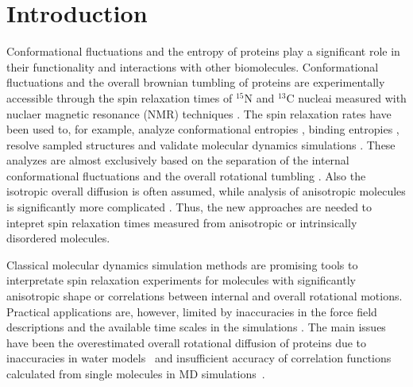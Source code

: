 \documentclass[pre,aps,floatfix,authordate1-4,twocolumn]{revtex4-1}
\begin{document}

\maketitle %



\section{Introduction}
Conformational fluctuations and the entropy of proteins
play a significant role in their functionality
and interactions with other biomolecules.
Conformational fluctuations and the overall brownian tumbling of proteins
are experimentally accessible through the 
spin relaxation times of $^{15}$N and $^{13}$C nucleai measured
with nuclaer magnetic resonance (NMR) 
techniques \cite{jarymowycz06,korzhnev01,mulder01,eisenmesser05,bedem15,lewandowski15,lamley15}. 
The spin relaxation rates have been used to, for example, analyze
conformational entropies \cite{yang96,kasinath13,allner15,jarymowycz06}, binding entropies \cite{akke93,jarymowycz06},
resolve sampled structures \cite{mulder01,eisenmesser05,bedem15,medina14}
and validate molecular dynamics simulations \cite{best04,showalter07a,showalter07b,maragakis08,trbovic08}.
These analyzes are almost exclusively based on the
separation of the internal conformational fluctuations 
and the overall rotational tumbling \cite{wennerstrom79,Lipari82}.
Also the isotropic overall diffusion is often assumed, while
analysis of anisotropic molecules is significantly more
complicated \cite{woessner62,shimizu62,jarymowycz06,korzhnev01,luginbuhl97,hall04}.
Thus, the new approaches are needed to intepret spin relaxation times
measured from anisotropic or intrinsically disordered molecules.

Classical molecular dynamics simulation methods are
promising tools to interpretate spin relaxation experiments
for molecules with significantly anisotropic shape or correlations between
internal and overall rotational motions. Practical applications
are, however, limited by inaccuracies in the force field descriptions
and the available time scales in the simulations \cite{prompers02,maragakis08,trbovic08,wong08,anderson12}.
The main issues have been the overestimated overall rotational diffusion of proteins
due to inaccuracies in water models~\cite{wong08} and
insufficient accuracy of correlation functions calculated from
single molecules in MD simulations~\cite{lu06,anderson12}.
\end{document}
